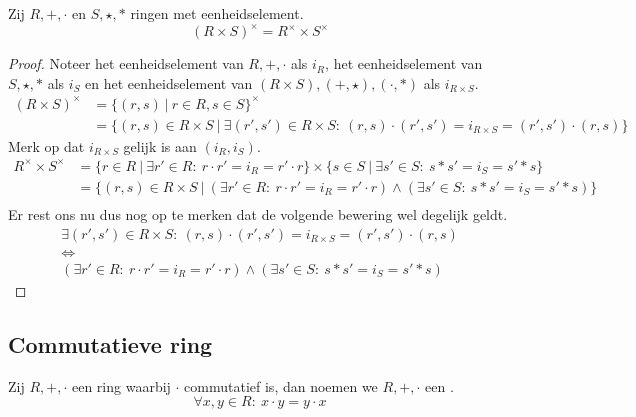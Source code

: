 \documentclass[main.tex]{subfiles}
\begin{document}
\begin{st}
  Zij $R,+,\cdot$ en $S,\star,*$ ringen met eenheidselement.
  \[ (R \times S)^{\times} = R^{\times}\times S^{\times} \]

  \begin{proof}
    Noteer het eenheidselement van $R,+,\cdot$ als $i_{R}$, het eenheidselement van $S,\star,*$ als $i_{S}$ en het eenheidselement van $(R \times S),(+,\star),(\cdot,*)$ als $i_{R \times S}$.
    \[
    \begin{array}{rll}
      (R \times S)^{\times} &= \{ (r,s) \ |\ r \in R, s \in S \}^{\times} &\\
                          &= \{ (r,s) \in R\times S \ |\ \exists (r',s') \in R\times S:\ (r,s) \cdot (r',s') = i_{R \times S} = (r',s') \cdot (r,s) \}
    \end{array}
    \]
    Merk op dat $i_{R\times S}$ gelijk is aan $(i_{R},i_{S})$.
    \[
    \begin{array}{rll}
      R^{\times} \times S^{\times} &= \{ r \in R \ |\ \exists r' \in R:\ r \cdot r' = i_{R} = r' \cdot r \} \times \{ s \in S \ |\ \exists s' \in S:\ s * s' = i_{S} = s' * s \} &\\
                               &= \{ (r,s) \in R \times S \ |\ (\exists r' \in R:\ r \cdot r' = i_{R} = r' \cdot r) \wedge (\exists s' \in S:\ s * s' = i_{S} = s' * s) \} &\\
    \end{array}
    \]
    Er rest ons nu dus nog op te merken dat de volgende bewering wel degelijk geldt.
    \[
    \begin{array}{c}
      \exists (r',s') \in R\times S:\ (r,s) \cdot (r',s') = i_{R \times S} = (r',s') \cdot (r,s)\\
      \Leftrightarrow \\
      (\exists r' \in R:\ r \cdot r' = i_{R} = r' \cdot r) \wedge (\exists s' \in S:\ s * s' = i_{S} = s' * s)
    \end{array}
    \]
  \end{proof}
\end{st}

\subsection{Commutatieve ring}
\label{sec:commutatieve-rin}

\begin{de}
  Zij $R,+,\cdot$ een ring waarbij $\cdot$ commutatief is, dan noemen we $R,+,\cdot$ een .
  \[ \forall x,y \in R:\ x\cdot y = y \cdot x \]
\end{de}
\end{document}
